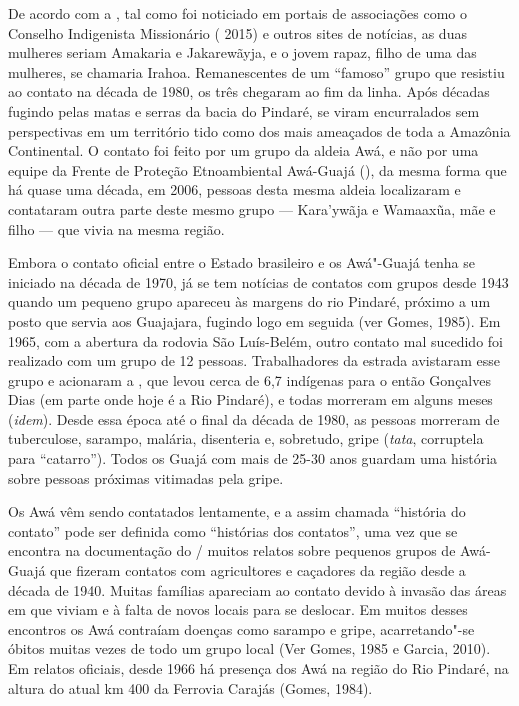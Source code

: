 De acordo com a , tal como foi noticiado em portais de associações
como o Conselho Indigenista Missionário ( 2015) e outros sites de
notícias, as duas mulheres seriam Amakaria e Jakarewãyja, e o jovem
rapaz, filho de uma das mulheres, se chamaria Irahoa. Remanescentes de
um ``famoso'' grupo que resistiu ao contato na década de 1980, os três
chegaram ao fim da linha. Após décadas fugindo pelas matas e serras da
bacia do Pindaré, se viram encurralados sem perspectivas em um
território tido como dos mais ameaçados de toda a Amazônia Continental.
O contato foi feito por um grupo da aldeia Awá, e não por uma equipe da
Frente de Proteção Etnoambiental Awá-Guajá (), da mesma forma que
há quase uma década, em 2006, pessoas desta mesma aldeia localizaram e
contataram outra parte deste mesmo grupo --- Kara'ywãja e Wamaaxũa, mãe e
filho --- que vivia na mesma região.

Embora o contato oficial entre o Estado brasileiro e os Awá"-Guajá tenha
se iniciado na década de 1970, já se tem notícias de contatos com grupos
desde 1943 quando um pequeno grupo apareceu às margens do rio Pindaré,
próximo a um posto que servia aos Guajajara, fugindo logo em seguida
(ver Gomes, 1985). Em 1965, com a abertura da rodovia São Luís-Belém,
outro contato mal sucedido foi realizado com um grupo de 12 pessoas.
Trabalhadores da estrada avistaram esse grupo e acionaram a , que
levou cerca de 6,7 indígenas para o então  Gonçalves Dias (em parte
onde hoje é a  Rio Pindaré), e todas morreram em alguns meses (\emph{idem}).
Desde essa época até o final da década de 1980, as pessoas morreram de
tuberculose, sarampo, malária, disenteria e, sobretudo, gripe
(\emph{tata}, corruptela para ``catarro''). Todos os Guajá com mais de
25-30 anos guardam uma história sobre pessoas próximas vitimadas pela
gripe.

Os Awá vêm sendo contatados lentamente, e a assim chamada ``história do
contato'' pode ser definida como ``histórias dos contatos'', uma vez que
se encontra na documentação do / muitos relatos sobre pequenos
grupos de Awá-Guajá que fizeram contatos com agricultores e caçadores da
região desde a década de 1940. Muitas famílias apareciam ao contato
devido à invasão das áreas em que viviam e à falta de novos locais para
se deslocar. Em muitos desses encontros os Awá contraíam doenças como
sarampo e gripe, acarretando"-se óbitos muitas vezes de todo um grupo
local (Ver Gomes, 1985 e Garcia, 2010). Em relatos oficiais, desde 1966 há
presença dos Awá na região do Rio Pindaré, na altura do atual km 400 da
Ferrovia Carajás (Gomes, 1984).

